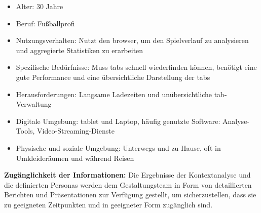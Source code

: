 \begin{enumerate}
\begin{itemize}
        \item Alter: 30 Jahre
        \item Beruf: Fußballprofi
        \item Nutzungsverhalten: Nutzt den \gls{browser}, um den Spielverlauf zu analysieren und aggregierte Statistiken zu erarbeiten
        \item Spezifische Bedürfnisse: Muss \gls{tab}s schnell wiederfinden können, benötigt eine gute Performance und eine übersichtliche Darstellung der \gls{tab}s
        \item Herausforderungen: Langsame Ladezeiten und unübersichtliche \gls{tab}-Verwaltung
        \item Digitale Umgebung: \gls{tab}let und Laptop, häufig genutzte Software: Analyse-Tools, Video-Streaming-Dienste
        \item Physische und soziale Umgebung: Unterwegs und zu Hause, oft in Umkleideräumen und während Reisen
    \end{itemize}
\end{enumerate}

\textbf{Zugänglichkeit der Informationen:}
Die Ergebnisse der Kontextanalyse und die definierten Personas werden dem Gestaltungsteam in Form von detaillierten Berichten und Präsentationen zur Verfügung gestellt, um sicherzustellen, dass sie zu geeigneten Zeitpunkten und in geeigneter Form zugänglich sind.

